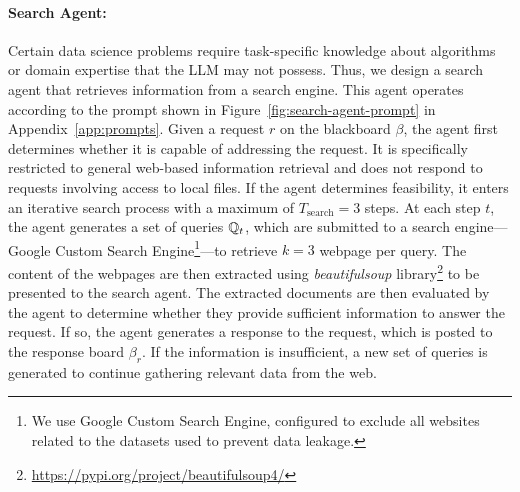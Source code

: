 \paragraph{Search Agent:}

Certain data science problems require task-specific knowledge about algorithms or domain expertise that the LLM may not possess. Thus, we design a search agent that retrieves information from a search engine. This agent operates according to the prompt shown in Figure~\ref{fig:search-agent-prompt} in Appendix~\ref{app:prompts}. Given a request $r$ on the blackboard $\beta$, the agent first determines whether it is capable of addressing the request. It is specifically restricted to general web-based information retrieval and does not respond to requests involving access to local files. If the agent determines feasibility, it enters an iterative search process with a maximum of $T_{\text{search}} = 3$ steps. At each step $t$, the agent generates a set of queries ${\mathbb{Q}}_{t}$, which are submitted to a search engine---Google Custom Search Engine\footnote{We use Google Custom Search Engine, configured to exclude all websites related to the datasets used to prevent data leakage.}---to retrieve $k=3$ webpage per query. The content of the webpages are then extracted using \textit{beautifulsoup} library\footnote{\url{https://pypi.org/project/beautifulsoup4/}} to be presented to the search agent. The extracted documents are then evaluated by the agent to determine whether they provide sufficient information to answer the request. If so, the agent generates a response to the request, which is posted to the response board $\beta_r$. If the information is insufficient, a new set of queries is generated to continue gathering relevant data from the web.
